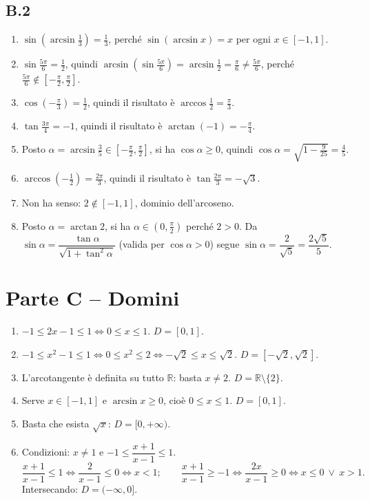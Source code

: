 \documentclass[11pt,a4paper]{article}
\begin{document}
\subsection*{B.2}
\begin{enumerate}
\item $\sin\left(\arcsin\frac13\right)=\frac13$, perch\'e $\sin(\arcsin x)=x$ per ogni $x\in[-1,1]$.
\item $\sin\frac{5\pi}{6}=\frac12$, quindi $\arcsin\left(\sin\frac{5\pi}{6}\right)=\arcsin\frac12=\frac{\pi}{6}\neq\frac{5\pi}{6}$, perch\'e $\frac{5\pi}{6}\notin\left[-\frac{\pi}{2},\frac{\pi}{2}\right]$.
\item $\cos\left(-\frac{\pi}{3}\right)=\frac12$, quindi il risultato \`e $\arccos\frac12=\frac{\pi}{3}$.
\item $\tan\frac{3\pi}{4}=-1$, quindi il risultato \`e $\arctan(-1)=-\frac{\pi}{4}$.
\item Posto $\alpha=\arcsin\frac35\in\left[-\frac{\pi}{2},\frac{\pi}{2}\right]$, si ha $\cos\alpha\ge0$, quindi $\cos\alpha=\sqrt{1-\frac{9}{25}}=\frac45$.
\item $\arccos\left(-\frac12\right)=\frac{2\pi}{3}$, quindi il risultato \`e $\tan\frac{2\pi}{3}=-\sqrt3$.
\item Non ha senso: $2\notin[-1,1]$, dominio dell'arcoseno.
\item Posto $\alpha=\arctan 2$, si ha $\alpha\in\left(0,\frac{\pi}{2}\right)$ perch\'e $2>0$. Da $\sin\alpha=\dfrac{\tan\alpha}{\sqrt{1+\tan^2\alpha}}$ (valida per $\cos\alpha>0$) segue $\sin\alpha=\dfrac{2}{\sqrt5}=\dfrac{2\sqrt5}{5}$.
\end{enumerate}

\section*{Parte C -- Domini}
\begin{enumerate}
\item $-1\le 2x-1\le 1 \iff 0\le x\le 1$. \quad $D=[0,1]$.
\item $-1\le x^2-1\le 1 \iff 0\le x^2\le 2 \iff -\sqrt2\le x\le\sqrt2$. \quad $D=\left[-\sqrt2,\sqrt2\right]$.
\item L'arcotangente \`e definita su tutto $\mathbb{R}$: basta $x\neq 2$. \quad $D=\mathbb{R}\setminus\{2\}$.
\item Serve $x\in[-1,1]$ e $\arcsin x\ge0$, cio\`e $0\le x\le 1$. \quad $D=[0,1]$.
\item Basta che esista $\sqrt x$: \quad $D=[0,+\infty)$.
\item Condizioni: $x\neq1$ e $-1\le\dfrac{x+1}{x-1}\le1$.
\[
\frac{x+1}{x-1}\le 1 \iff \frac{2}{x-1}\le 0 \iff x<1;
\qquad
\frac{x+1}{x-1}\ge -1 \iff \frac{2x}{x-1}\ge 0 \iff x\le 0 \ \vee\ x>1.
\]
Intersecando: $D=(-\infty,0]$.
\end{enumerate}
\end{document}
